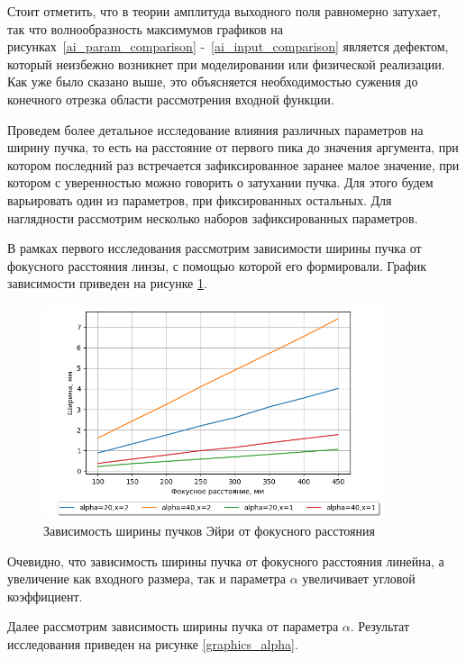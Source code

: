 {    Стоит отметить, что в теории амплитуда выходного поля
    равномерно затухает, так что волнообразность максимумов графиков на
    рисунках~\ref{ai_param_comparison} -~\ref{ai_input_comparison} является дефектом,
    который неизбежно возникнет при моделировании или физической реализации. Как уже было сказано выше, это
    объясняется необходимостью сужения до конечного отрезка области
    рассмотрения входной функции.

    Проведем более детальное исследование влияния различных параметров на ширину пучка, то есть на расстояние
    от первого пика до значения аргумента, при котором последний раз встречается зафиксированное заранее малое значение, при котором с уверенностью можно говорить о затухании пучка. Для этого будем варьировать один из параметров,
    при фиксированных остальных. Для наглядности рассмотрим несколько наборов зафиксированных параметров.

    В рамках первого исследования рассмотрим зависимости ширины пучка от фокусного расстояния линзы, с помощью которой
    его формировали. График зависимости приведен на рисунке \ref{graphics_focus}.

    \begin{figure}[H]
        \begin{center}
            \includegraphics[width=10cm]{plots/!graphics_focus}
            \caption{Зависимость ширины пучков Эйри от фокусного расстояния}
            \label{graphics_focus}
        \end{center}
    \end{figure}

    Очевидно, что зависимость ширины пучка от фокусного расстояния линейна, а увеличение как входного размера, так и
    параметра $\alpha$ увеличивает угловой коэффициент.

    Далее рассмотрим зависимость ширины пучка от параметра $\alpha$. Результат исследования приведен на рисунке \ref{graphics_alpha}.

}
